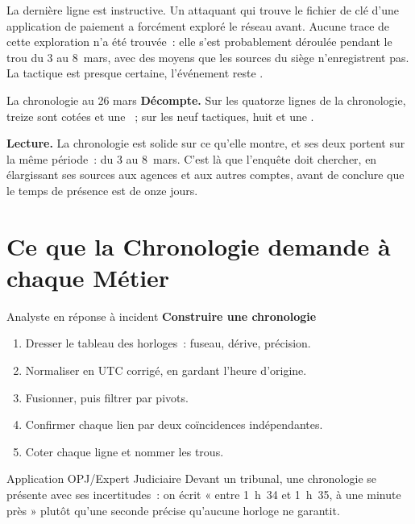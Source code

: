 La dernière ligne est instructive. Un attaquant qui trouve le fichier de clé
d'une application de paiement a forcément exploré le réseau avant. Aucune
trace de cette exploration n'a été trouvée~: elle s'est probablement
déroulée pendant le trou du 3 au 8~mars, avec des moyens que les sources du
siège n'enregistrent pas. La tactique est presque certaine, l'événement
reste \NEK{}.

\begin{boxlecture}{La chronologie au 26 mars}
\textbf{Décompte.} Sur les quatorze lignes de la chronologie, treize sont
cotées \OUI{} et une \NEK{}~; sur les neuf tactiques, huit \OUI{} et une
\NEK{}.

\medskip
\textbf{Lecture.} La chronologie est solide sur ce qu'elle montre, et ses
deux \NEK{} portent sur la même période~: du 3 au 8~mars. C'est là que
l'enquête doit chercher, en élargissant ses sources aux agences et aux
autres comptes, avant de conclure que le temps de présence est de onze
jours.
\end{boxlecture}

\section{Ce que la Chronologie demande à chaque Métier}
\label{sec:c07-metiers}

\begin{boxmetier}{Analyste en réponse à incident}
\textbf{Construire une chronologie}
\begin{enumerate}
    \item Dresser le tableau des horloges~: fuseau, dérive, précision.
    \item Normaliser en UTC corrigé, en gardant l'heure d'origine.
    \item Fusionner, puis filtrer par pivots.
    \item Confirmer chaque lien par deux coïncidences indépendantes.
    \item Coter chaque ligne et nommer les trous.
\end{enumerate}
\end{boxmetier}

\begin{boxmetier}{Application OPJ/Expert Judiciaire}
Devant un tribunal, une chronologie se présente avec ses incertitudes~: on
écrit « entre 1~h~34 et 1~h~35, à une minute près » plutôt qu'une seconde
précise qu'aucune horloge ne garantit.
\end{boxmetier}


